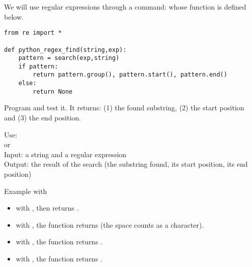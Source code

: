 \documentclass[11pt,class=report,crop=false]{standalone}
\begin{document}
\begin{cours}
We will use regular expressions through a command:  
whose function is defined below.


\begin{lstlisting}
from re import *

def python_regex_find(string,exp):
    pattern = search(exp,string)
    if pattern:
        return pattern.group(), pattern.start(), pattern.end()
    else:
        return None
\end{lstlisting}

Program and test it. It returns: (1) the found substring, (2) the start position and (3) the end position.

\begin{fonctionpython}
    Use:  \\
    \hspace*{9ex} or \\
    Input: a string  and a regular expression  \\
    Output: the result of the search (the substring found, its start position, its end position) 
  
  \medskip
     
   Example with 
  \begin{itemize}  
    \item with , then  returns
    .
    \item with , the function returns
     (the space counts as a character).
    \item with , the function returns
    .
    
    
    \item with , the function returns .
    

  \end{itemize} 
  \end{fonctionpython}  

\end{cours}


\end{document}
